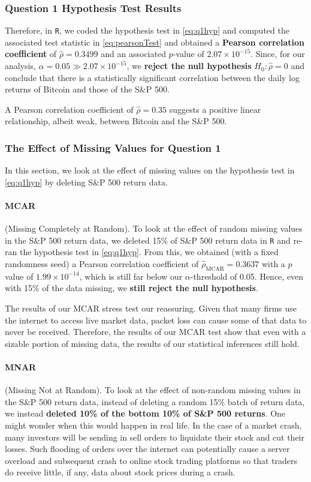\documentclass[12pt]{article}
\begin{document}
		\subsubsection{Question 1 Hypothesis Test Results}
		Therefore, in \texttt{R}, we coded the hypothesis test in \autoref{eq:q1hyp} and computed the associated test statistic in \autoref{eq:pearsonTest} and obtained a \textbf{Pearson correlation coefficient} of $\hat{\rho} = 0.3499$ and an associated $p$-value of $2.07 \times 10^{-15}$.  Since, for our analysis, $\alpha = 0.05 \gg 2.07 \times 10^{-15}$, we \textbf{reject the null hypothesis} $H_0: \hat{\rho} = 0$ and conclude that there is a statistically significant correlation between the daily log returns of Bitcoin and those of the S\&P 500. 
		
		
		A Pearson correlation coefficient of $\hat{\rho} = 0.35$ suggests a positive linear relationship, albeit weak, between Bitcoin and the S\&P 500. 
		
		\subsubsection{The Effect of Missing Values for Question 1}
		In this section, we look at the effect of missing values on the hypothesis test in \autoref{eq:q1hyp} by deleting S\&P 500 return data.
		\paragraph{MCAR} (Missing Completely at Random). To look at the effect of random missing values in the S\&P 500 return data, we deleted 15\% of S\&P 500 return data in \texttt{R} and re-ran the hypothesis test in \autoref{eq:q1hyp}. From this, we obtained (with a fixed randomness seed) a Pearson correlation coefficient of $\hat{\rho}_{\mathrm{MCAR}} = 0.3637$ with a $p$ value of $1.99 \times 10^{-14}$, which is still far below our $\alpha$-threshold of 0.05. Hence, even with 15\% of the data missing, we \textbf{still reject the null hypothesis}. 
		
		
		The results of our MCAR stress test our reassuring. Given that many firms use the internet to access live market data, packet loss can cause some of that data to never be received. Therefore, the results of our MCAR test show that even with a sizable portion of missing data, the results of our statistical inferences still hold. 
		\paragraph{MNAR} (Missing Not at Random). To look at the effect of non-random missing values in the S\&P 500 return data, instead of deleting a random 15\% batch of return data, we instead \textbf{deleted 10\% of the bottom 10\% of S\&P 500 returns}. One might wonder when this would happen in real life. In the case of a market crash, many investors will be sending in sell orders to liquidate their stock and cut their losses. Such flooding of orders over the internet can potentially cause a server overload and subsequent crash to online stock trading platforms so that traders do receive little, if any, data about stock prices during a crash. 
		
\end{document}
